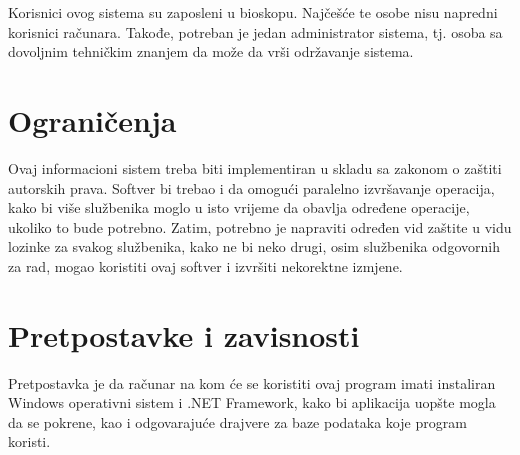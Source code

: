 Korisnici ovog sistema su zaposleni u bioskopu. Najčešće te osobe nisu napredni korisnici računara. Takođe, potreban je jedan administrator sistema, tj. osoba sa dovoljnim tehničkim znanjem da može da vrši održavanje sistema.
%
%

\section{Ograničenja}

Ovaj informacioni sistem treba biti implementiran u skladu sa zakonom o zaštiti autorskih prava. Softver bi trebao i da
omogući paralelno izvršavanje operacija, kako bi više službenika moglo u isto
vrijeme da obavlja određene operacije, ukoliko to bude potrebno.
Zatim, potrebno je napraviti određen vid zaštite u vidu lozinke za svakog službenika, kako ne bi neko drugi, osim službenika odgovornih za rad, mogao koristiti ovaj softver i izvršiti nekorektne izmjene.

\section{Pretpostavke i zavisnosti}

Pretpostavka je da računar na kom će se koristiti ovaj program imati
instaliran Windows operativni sistem i .NET Framework, kako bi aplikacija uopšte
mogla da se pokrene, kao i odgovarajuće drajvere za baze podataka koje program koristi.

